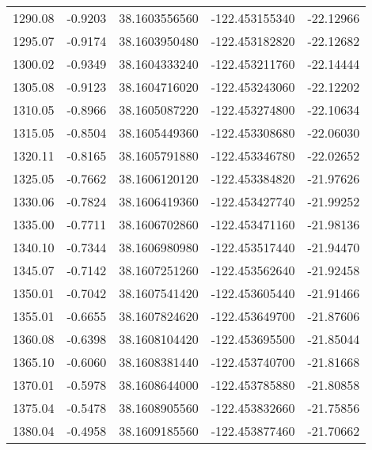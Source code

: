 \begin{scriptsize}
\begin{longtable}{p{2.5cm}p{2.5cm}p{3cm}p{3cm}p{2.5cm}}
          1290.08  & 	-0.9203 &               38.1603556560  &   -122.453155340   &	-22.12966 \\
          1295.07  & 	-0.9174 &               38.1603950480  &   -122.453182820   &	-22.12682 \\
          1300.02  & 	-0.9349 &               38.1604333240  &   -122.453211760   &	-22.14444 \\
          1305.08  & 	-0.9123 &               38.1604716020  &   -122.453243060   &	-22.12202 \\
          1310.05  & 	-0.8966 &               38.1605087220  &   -122.453274800   &	-22.10634 \\
          1315.05  & 	-0.8504 &               38.1605449360  &   -122.453308680   &	-22.06030 \\
          1320.11  & 	-0.8165 &               38.1605791880  &   -122.453346780   &	-22.02652 \\
          1325.05  & 	-0.7662 &               38.1606120120  &   -122.453384820   &	-21.97626 \\
          1330.06  & 	-0.7824 &               38.1606419360  &   -122.453427740   &	-21.99252 \\
          1335.00  & 	-0.7711 &               38.1606702860  &   -122.453471160   &	-21.98136 \\
          1340.10  & 	-0.7344 &               38.1606980980  &   -122.453517440   &	-21.94470 \\
          1345.07  & 	-0.7142 &               38.1607251260  &   -122.453562640   &	-21.92458 \\
          1350.01  & 	-0.7042 &               38.1607541420  &   -122.453605440   &	-21.91466 \\
          1355.01  & 	-0.6655 &               38.1607824620  &   -122.453649700   &	-21.87606 \\
          1360.08  & 	-0.6398 &               38.1608104420  &   -122.453695500   &	-21.85044 \\
          1365.10  & 	-0.6060 &               38.1608381440  &   -122.453740700   &	-21.81668 \\
          1370.01  & 	-0.5978 &               38.1608644000  &   -122.453785880   &	-21.80858 \\
          1375.04  & 	-0.5478 &               38.1608905560  &   -122.453832660   &	-21.75856 \\
          1380.04  & 	-0.4958 &               38.1609185560  &   -122.453877460   &	-21.70662 \\

\end{longtable}
\end{scriptsize}
